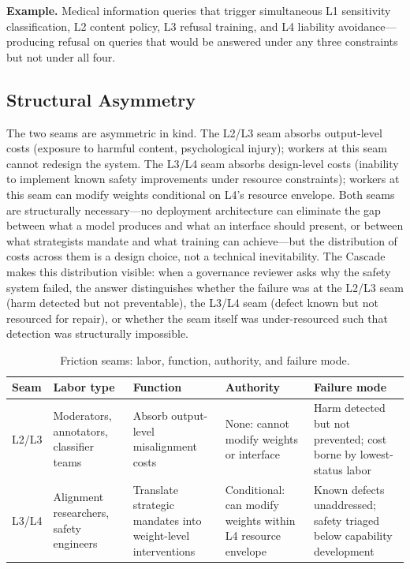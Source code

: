 \textbf{Example.} Medical information queries that trigger simultaneous L1 sensitivity classification, L2 content policy, L3 refusal training, and L4 liability avoidance---producing refusal on queries that would be answered under any three constraints but not under all four.

\subsection{Structural Asymmetry}

The two seams are asymmetric in kind. The L2/L3 seam absorbs output-level costs (exposure to harmful content, psychological injury); workers at this seam cannot redesign the system. The L3/L4 seam absorbs design-level costs (inability to implement known safety improvements under resource constraints); workers at this seam can modify weights conditional on L4's resource envelope. Both seams are structurally necessary---no deployment architecture can eliminate the gap between what a model produces and what an interface should present, or between what strategists mandate and what training can achieve---but the distribution of costs across them is a design choice, not a technical inevitability. The Cascade makes this distribution visible: when a governance reviewer asks why the safety system failed, the answer distinguishes whether the failure was at the L2/L3 seam (harm detected but not preventable), the L3/L4 seam (defect known but not resourced for repair), or whether the seam itself was under-resourced such that detection was structurally impossible.

\begin{table}[!htbp]
\centering
\small
\caption{Friction seams: labor, function, authority, and failure mode.}
\label{tab:seams}
{\setlength{\tabcolsep}{4pt}
\begin{tabularx}{\columnwidth}{@{}l l Y Y Y@{}}
\toprule
\textbf{Seam} & \textbf{Labor type} & \textbf{Function} & \textbf{Authority} & \textbf{Failure mode} \\
\midrule
L2/L3 & Moderators, annotators, classifier teams & Absorb output-level misalignment costs & None: cannot modify weights or interface & Harm detected but not prevented; cost borne by lowest-status labor \\
L3/L4 & Alignment researchers, safety engineers & Translate strategic mandates into weight-level interventions & Conditional: can modify weights within L4 resource envelope & Known defects unaddressed; safety triaged below capability development \\
\bottomrule
\end{tabularx}}
\end{table}

